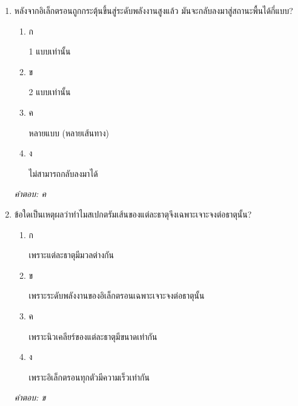 \documentclass[12pt]{article}
\begin{document}
\begin{enumerate}[label=\arabic*., itemsep=0.5\baselineskip, topsep=0.5\baselineskip, leftmargin=*]
\item หลังจากอิเล็กตรอนถูกกระตุ้นขึ้นสู่ระดับพลังงานสูงแล้ว มันจะกลับลงมาสู่สถานะพื้นได้กี่แบบ?
\begin{enumerate}[label=\alph*)., itemsep=0.3\baselineskip, topsep=0.3\baselineskip]
\item ก\ 
\begin{minipage}[t]{0.9\linewidth}
\raggedright 1 แบบเท่านั้น
\end{minipage}
\item ข\ 
\begin{minipage}[t]{0.9\linewidth}
\raggedright 2 แบบเท่านั้น
\end{minipage}
\item ค\ 
\begin{minipage}[t]{0.9\linewidth}
\raggedright หลายแบบ (หลายเส้นทาง)
\end{minipage}
\item ง\ 
\begin{minipage}[t]{0.9\linewidth}
\raggedright ไม่สามารถกลับลงมาได้
\end{minipage}
\end{enumerate}
\vspace{-0.3\baselineskip}
\begin{small}
\textit{คำตอบ: ค}
\end{small}

\item ข้อใดเป็นเหตุผลว่าทำไมสเปกตรัมเส้นของแต่ละธาตุจึงเฉพาะเจาะจงต่อธาตุนั้น?
\begin{enumerate}[label=\alph*)., itemsep=0.3\baselineskip, topsep=0.3\baselineskip]
\item ก\ 
\begin{minipage}[t]{0.9\linewidth}
\raggedright เพราะแต่ละธาตุมีมวลต่างกัน
\end{minipage}
\item ข\ 
\begin{minipage}[t]{0.9\linewidth}
\raggedright เพราะระดับพลังงานของอิเล็กตรอนเฉพาะเจาะจงต่อธาตุนั้น
\end{minipage}
\item ค\ 
\begin{minipage}[t]{0.9\linewidth}
\raggedright เพราะนิวเคลียร์ของแต่ละธาตุมีขนาดเท่ากัน
\end{minipage}
\item ง\ 
\begin{minipage}[t]{0.9\linewidth}
\raggedright เพราะอิเล็กตรอนทุกตัวมีความเร็วเท่ากัน
\end{minipage}
\end{enumerate}
\vspace{-0.3\baselineskip}
\begin{small}
\textit{คำตอบ: ข}
\end{small}

\end{enumerate}
\end{document}
